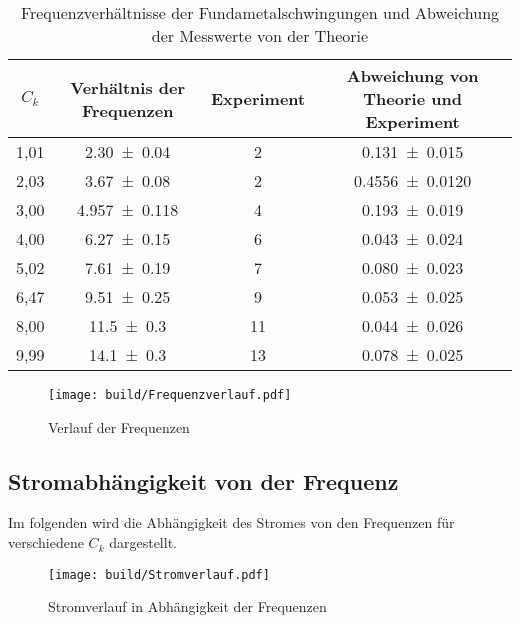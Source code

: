 \begin{table}[H]
    \centering
    \begin{tabular}{c c c c}
        \toprule
        $C_k$    &   Verhältnis der Frequenzen & Experiment & Abweichung von Theorie und Experiment\\
        \midrule
        1,01 & \num{2,30\pm 0,04}     & \num{2}        & \num{0,131\pm 0,015}\\        
        2,03 & \num{3,67\pm 0,08}     & \num{2}        & \num{0,4556\pm 0,0120}\\
        3,00 & \num{4,957\pm 0,118}   & \num{4}        & \num{0,193\pm 0,019}\\
        4,00 & \num{6,27\pm 0,15}     & \num{6}        & \num{0,043\pm 0,024}\\
        5,02 & \num{7,61\pm 0,19}     & \num{7}        & \num{0,080\pm 0,023}\\
        6,47 & \num{9,51\pm 0,25}     & \num{9}        & \num{0,053\pm 0,025}\\
        8,00 & \num{11,5\pm 0,3}      & \num{11}       & \num{0,044\pm 0,026}\\       
        9,99 & \num{14,1\pm 0,3}      & \num{13}       & \num{0,078\pm 0,025}\\
       \bottomrule
    \end{tabular}
    \caption{Frequenzverhältnisse der Fundametalschwingungen und Abweichung der Messwerte von der Theorie}
    \label{tab:Frequenzverhältnisse}
\end{table}

\begin{figure}[H]
    \centering
    \texttt{[image: build/Frequenzverlauf.pdf]}
    \caption{Verlauf der Frequenzen}
    \label{fig:frequenzverlauf}
\end{figure}

\subsection{Stromabhängigkeit von der Frequenz}
Im folgenden wird die Abhängigkeit des Stromes von den Frequenzen für verschiedene $C_k$ dargestellt.
\begin{figure}
    \centering
    \texttt{[image: build/Stromverlauf.pdf]}
    \caption{Stromverlauf in Abhängigkeit der Frequenzen}
    \label{fig:Stromverlauf}
\end{figure}



\label{sec:Auswertung}